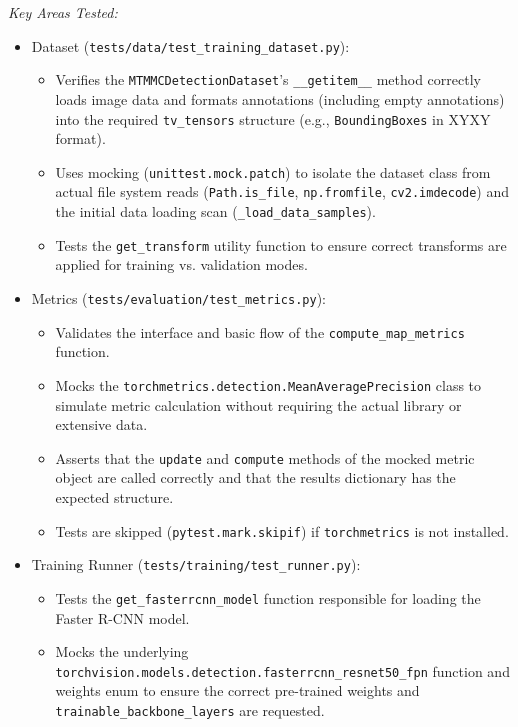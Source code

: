 \textit{Key Areas Tested:}
\begin{itemize}
    \item Dataset (\texttt{tests/data/test\_training\_dataset.py}):
    \begin{itemize}
        \item Verifies the \texttt{MTMMCDetectionDataset}'s \texttt{\_\_getitem\_\_} method correctly loads image data and formats annotations (including empty annotations) into the required \texttt{tv\_tensors} structure (e.g., \texttt{BoundingBoxes} in XYXY format).
        \item Uses mocking (\texttt{unittest.mock.patch}) to isolate the dataset class from actual file system reads (\texttt{Path.is\_file}, \texttt{np.fromfile}, \texttt{cv2.imdecode}) and the initial data loading scan (\texttt{\_load\_data\_samples}).
        \item Tests the \texttt{get\_transform} utility function to ensure correct transforms are applied for training vs. validation modes.
    \end{itemize}
    \item Metrics (\texttt{tests/evaluation/test\_metrics.py}):
    \begin{itemize}
        \item Validates the interface and basic flow of the \texttt{compute\_map\_metrics} function.
        \item Mocks the \texttt{torchmetrics.detection.MeanAveragePrecision} class to simulate metric calculation without requiring the actual library or extensive data.
        \item Asserts that the \texttt{update} and \texttt{compute} methods of the mocked metric object are called correctly and that the results dictionary has the expected structure.
        \item Tests are skipped (\texttt{pytest.mark.skipif}) if \texttt{torchmetrics} is not installed.
    \end{itemize}
    \item Training Runner (\texttt{tests/training/test\_runner.py}):
    \begin{itemize}
        \item Tests the \texttt{get\_fasterrcnn\_model} function responsible for loading the Faster R-CNN model.
        \item Mocks the underlying \texttt{torchvision.models.detection.fasterrcnn\_resnet50\_fpn} function and weights enum to ensure the correct pre-trained weights and \texttt{trainable\_backbone\_layers} are requested.

\end{itemize}
\end{itemize}

